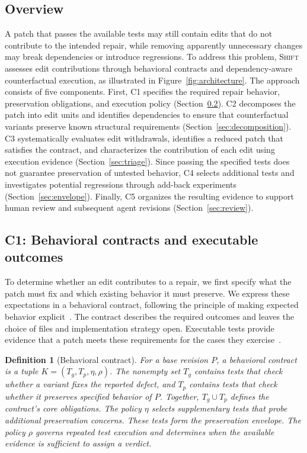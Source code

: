 \documentclass[a4paper,fleqn]{cas-sc}
\newcommand{\tool}{\textsc{Shift}}
\newtheorem{definition}{Definition}
\begin{document}
\subsection{Overview}\label{sec:overview}

A patch that passes the available tests may still contain edits that do not contribute to the intended repair, while removing apparently unnecessary changes may break dependencies or introduce regressions. To address this problem, \tool{} assesses edit contributions through behavioral contracts and dependency-aware counterfactual execution, as illustrated in Figure~\ref{fig:architecture}. The approach consists of five components. First, C1 specifies the required repair behavior, preservation obligations, and execution policy (Section~\ref{sec:dsl}). C2 decomposes the patch into edit units and identifies dependencies to ensure that counterfactual variants preserve known structural requirements (Section~\ref{sec:decomposition}). C3 systematically evaluates edit withdrawals, identifies a reduced patch that satisfies the contract, and characterizes the contribution of each edit using execution evidence (Section~\ref{sec:triage}). Since passing the specified tests does not guarantee preservation of untested behavior, C4 selects additional tests and investigates potential regressions through add-back experiments (Section~\ref{sec:envelope}). Finally, C5 organizes the resulting evidence to support human review and subsequent agent revisions (Section~\ref{sec:review}). 


\subsection{C1: Behavioral contracts and executable outcomes}\label{sec:dsl}


To determine whether an edit contributes to a repair, we first specify what the patch must fix and which existing behavior it must preserve. We express these expectations in a behavioral contract, following the principle of making expected behavior explicit~\citep{meyer1992dbc}. The contract describes the required outcomes and leaves the choice of files and implementation strategy open. Executable tests provide evidence that a patch meets these requirements for the cases they exercise~\citep{barr2015oracle}.




\begin{definition}[Behavioral contract]\label{def:contract} For a base revision $P$, a \emph{behavioral contract} is a tuple $K=(T_g,T_p,\eta,\rho)$. The nonempty set $T_g$ contains tests that check whether a variant fixes the reported defect, and $T_p$ contains tests that check whether it preserves specified behavior of $P$. Together, $T_g\cup T_p$ defines the contract's \emph{core obligations}. The policy $\eta$ selects supplementary tests that probe additional preservation concerns. These tests form the \emph{preservation envelope}. The policy $\rho$ governs repeated test execution and determines when the available evidence is sufficient to assign a verdict. \end{definition}
\end{document}
